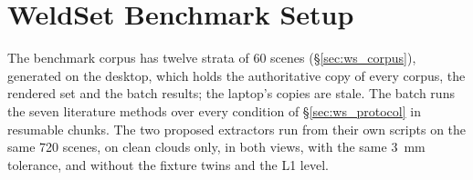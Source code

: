 \section{WeldSet Benchmark Setup}
\label{sec:setup_weldset}
The benchmark corpus has twelve strata of 60 scenes (\S\ref{sec:ws_corpus}), generated on the
desktop, which holds the authoritative copy of every corpus, the rendered set and the batch results;
the laptop's copies are stale. The batch runs the seven literature methods over every condition of
\S\ref{sec:ws_protocol} in resumable chunks. The two proposed extractors run from their own scripts on
the same 720 scenes, on clean clouds only, in both views, with the same 3~mm tolerance, and without
the fixture twins and the L1 level.
